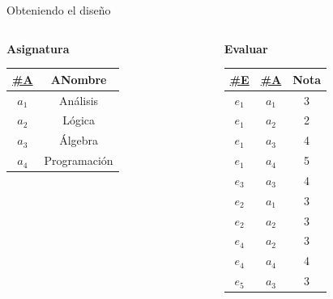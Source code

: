 \begin{frame}{Obteniendo el dise\~no}
\begin{columns}[T]
\begin{column}{0.68\linewidth}
\begin{columns}[T]
            \end{columns}

            \begin{center}
                \textbf{Asignatura}\\[2mm]

                \begin{tabular}{cc}
                    \underline{\#A} & ANombre\\[1mm]
                    \hline
                    $a_1$ & An\'alisis\\
                    $a_2$ & L\'ogica \\
                    $a_3$ & \'Algebra\\
                    $a_4$ & Programaci\'on
                    
                \end{tabular}
            \end{center}
            
        \end{column}

        \begin{column}{0.3\linewidth}
            \vspace{6mm}
            \begin{center}
                \textbf{Evaluar}\\[2mm]

                \begin{tabular}{ccc}
                    \underline{\#E} & \underline{\#A} & Nota\\[1mm]
                    \hline
                    $e_1$ & $a_1$ & 3\\
                    $e_1$ & $a_2$ & 2\\
                    $e_1$ & $a_3$ & 4\\
                    $e_1$ & $a_4$ & 5\\
                    $e_3$ & $a_3$ & 4\\
                    $e_2$ & $a_1$ & 3\\
                    $e_2$ & $a_2$ & 3\\
                    $e_4$ & $a_2$ & 3\\
                    $e_4$ & $a_4$ & 4\\
                    $e_5$ & $a_3$ & 3\\
                \end{tabular}
            \end{center}
        \end{column}
    \end{columns}
\end{frame}

